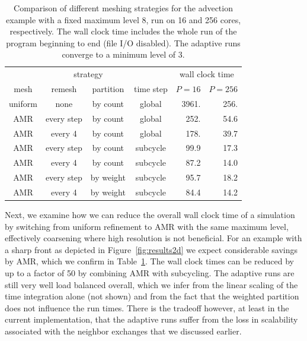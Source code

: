 \documentclass{IOS-Book-Article}     %
\newcommand{\Fig}[1]{Figure~\ref{fig:#1}}
\newcommand{\Tab}[1]{Table~\ref{tab:#1}}
\begin{document}
\begin{table}
  \begin{center}
    \begin{tabular}{cccc|rr}
      \multicolumn{4}{c|}{strategy} & \multicolumn{2}{c}{wall clock time} \\
      mesh & remesh & partition & time step & $P = 16$ & $P = 256$ \\
      \hline
      uniform & none       & by count  & global   & 3961.  & 256.  \\
      \hline
          AMR & every step & by count  & global   &  252.  &  54.6 \\
          AMR & every 4    & by count  & global   &  178.  &  39.7 \\
      \hline
          AMR & every step & by count  & subcycle &   99.9 &  17.3 \\
          AMR & every 4    & by count  & subcycle &   87.2 &  14.0 \\
      \hline
          AMR & every step & by weight & subcycle &   95.7 &  18.2 \\
          AMR & every 4    & by weight & subcycle &   84.4 & 14.2 \\
      \hline
    \end{tabular}
  \end{center}
\caption{Comparison of different meshing strategies for the advection example
  with a fixed maximum level 8, run on 16 and 256 cores, respectively.  The
  wall clock time includes the whole run of the program beginning to end (file
  I/O disabled).  The adaptive runs converge to a minimum level of 3.}
\label{tab:swirlwall}
\end{table}
Next, we examine how we can reduce the overall wall clock time of a simulation
by switching from uniform refinement to AMR with the same maximum level,
effectively coarsening where high resolution is not beneficial.  For an example
with a sharp front as depicted in \Fig{results2d} we expect considerable
savings by AMR, which we confirm in \Tab{swirlwall}.  The wall clock times can
be reduced by up to a factor of 50 by combining AMR with subcycling.  The
adaptive runs are still very well load balanced overall, which we infer from
the linear scaling of the time integration alone (not shown) and from the fact
that the weighted partition does not influence the run times.  There is the
tradeoff however, at least in the current implementation, that the adaptive
runs suffer from the loss in scalability associated with the neighbor exchanges
that we discussed earlier.
\end{document}
